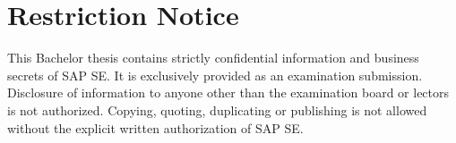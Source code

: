 \chapter*{Restriction Notice}

This Bachelor thesis contains strictly confidential information and business secrets of SAP SE. It is exclusively provided as an examination submission. Disclosure of information to anyone other than the examination board or lectors is not authorized. Copying, quoting, duplicating or publishing is not allowed without the explicit written authorization of SAP SE.

